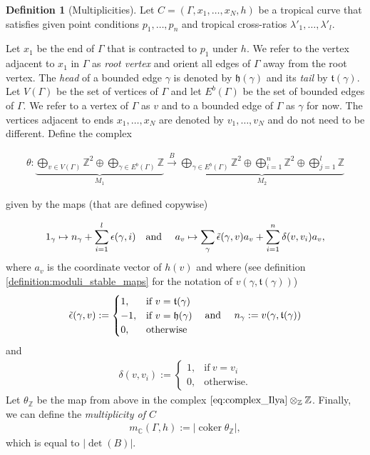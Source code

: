 \documentclass[11pt,reqno,a4]{amsart}
\theoremstyle{dotless}
\theoremstyle{definition}
\newtheorem{definition}[corollary]{Definition}
\newcommand{\coker}{\operatorname{coker}}
\begin{document}
\begin{definition}[Multiplicities]\label{Definition:Ilyas_multiplicities}
Let $C=(\Gamma,x_1,\dots,x_N,h)$ be a tropical curve that satisfies given point conditions $p_1,\dots,p_n$ and tropical cross-ratios $\lambda'_1,\dots,\lambda'_l$.

Let $x_1$ be the end of $\Gamma$ that is contracted to $p_1$ under $h$. We refer to the vertex adjacent to $x_1$ in $\Gamma$ as \textit{root vertex} and orient all edges of $\Gamma$ away from the root vertex. The \textit{head} of a bounded edge $\gamma$ is denoted by $\mathfrak{h}(\gamma)$ and its \textit{tail} by $\mathfrak{t}(\gamma)$. Let $V(\Gamma)$ be the set of vertices of $\Gamma$ and let $E^b(\Gamma)$ be the set of bounded edges of $\Gamma$. We refer to a vertex of $\Gamma$ as $v$ and to a bounded edge of $\Gamma$ as $\gamma$ for now. The vertices adjacent to ends $x_1,\dots,x_N$ are denoted by $v_1,\dots,v_N$ and do not need to be different. Define the complex

\begin{align}\label{eq:complex_Ilya}
\theta:\underbrace{\bigoplus_{v\in V(\Gamma)}\mathbb{Z}^2\oplus\bigoplus_{\gamma\in E^b(\Gamma)} \mathbb{Z}}_{M_1} \overset{B}{\longrightarrow} \underbrace{\bigoplus_{\gamma\in E^b(\Gamma)}\mathbb{Z}^2\oplus \bigoplus_{i=1}^{n}\mathbb{Z}^2 \oplus\bigoplus_{j=1}^{l}\mathbb{Z}}_{M_2} 
\end{align}


\noindent given by the maps (that are defined copywise)

\begin{align*}
1_\gamma\mapsto n_\gamma+\sum_{i=1}^{l}\epsilon(\gamma,i) \textrm{\quad and \quad}
a_v\mapsto \sum_\gamma \tilde{\epsilon}(\gamma,v)a_v+\sum_{i=1}^n\delta(v,v_i)a_v,
\end{align*}
where $a_v$ is the coordinate vector of $h(v)$ and where (see definition \ref{definition:moduli_stable_maps} for the notation of $v(\gamma,\mathfrak{t}(\gamma))$)
\begin{align*}
\tilde{\epsilon}(\gamma,v):=
\begin{cases}
      1, & \text{if}\ v=\mathfrak{t}(\gamma) \\
      -1, & \text{if}\ v=\mathfrak{h}(\gamma) \\
      0, & \text{otherwise}
\end{cases}
\textrm{\quad and \quad}
n_\gamma:=v(\gamma,\mathfrak{t}(\gamma))
\end{align*}
\noindent and
\begin{align*}
\delta(v,v_i):=
\begin{cases}
      1, & \text{if}\ v=v_i \\
      0, & \text{otherwise}.
\end{cases}
\end{align*}
\noindent Let $\theta_\mathbb{Z}$ be the map from above in the complex $\eqref{eq:complex_Ilya}\otimes_\mathbb{Z}\mathbb{Z}$. Finally, we can define the \textit{multiplicity of $C$}
\begin{align*}
m_\mathbb{C}(\Gamma,h):=|\coker\theta_\mathbb{Z}|,
\end{align*}
which is equal to $|\det(B)|$.
\end{definition}
\end{document}
